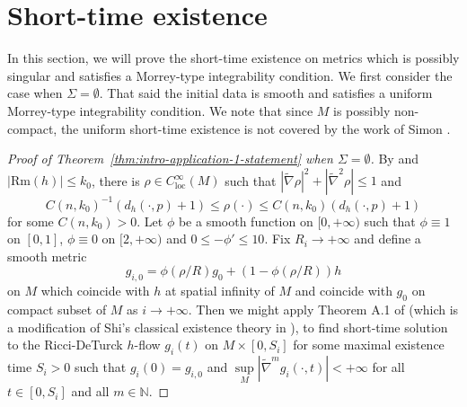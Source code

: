 \documentclass[12pt]{amsart}
\newcommand{\hdel}{\tilde{\nabla}}
\theoremstyle{remark}
\numberwithin{equation}{section}
\begin{document}
\section{Short-time existence}
In this section, we will prove the short-time existence on metrics which is possibly singular and satisfies a Morrey-type integrability condition. We first consider the case when $\Sigma=\emptyset$. That said the initial data is smooth and satisfies a uniform Morrey-type integrability condition. We note that since $M$ is possibly non-compact, the uniform short-time existence is not covered by the work of Simon \cite{simon_deformation_2002}.
\begin{proof}[Proof of Theorem~\ref{thm:intro-application-1-statement} when $\Sigma=\emptyset$]

By \cite{tam_exhaustion_2010} and $|\text{Rm}(h)|\leq k_0$, there is $\rho \in C^\infty_\text{loc}(M)$ such that $|\hdel \rho|^2 + |\hdel^2 \rho| \leq 1$ and
    \begin{equation*}
        C(n,k_0)^{-1}(d_h(\cdot, p)+1)\leq \rho(\cdot) \leq  C(n,k_0)(d_h(\cdot,p) + 1)
    \end{equation*}
    for some $ C(n,k_0)>0$. Let $\phi$ be a smooth function on $[0,+\infty)$ such that $\phi \equiv 1$ on $[0,1]$, $\phi \equiv 0$ on $[2,+\infty)$ and $0\leq-\phi'\leq 10$. Fix $R_i\to+\infty$ and define a smooth metric 
    $$g_{i,0}=\phi(\rho/R)g_0+(1-\phi(\rho/R)) h$$
on $M$ which coincide with $h$ at spatial infinity of $M$ and coincide with $g_0$ on compact subset of $M$ as $i\to+\infty$. Then we might apply Theorem A.1 of \cite{lamm_ricci_2021} (which is a modification of Shi's classical existence theory in \cite{shi_deforming_1989}), to find  short-time solution to the Ricci-DeTurck $h$-flow $g_i(t)$ on $M \times [0,S_i]$ for some maximal existence time $S_i > 0$ such that $g_i(0) = g_{i,0}$ and $\sup\limits_M |\hdel^m g_i(\cdot, t)|<+\infty$ for all $t \in [0, S_i]$ and all $m\in \mathbb{N}$. %


\end{proof}
\end{document}
